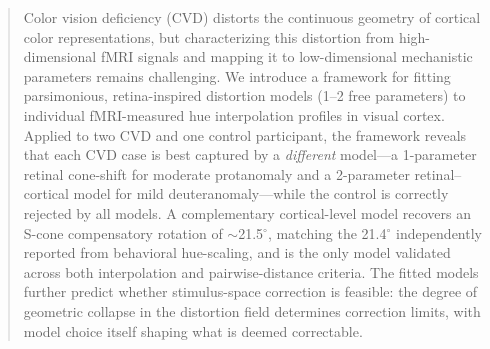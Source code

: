 \documentclass{article}
\begin{document}

\printAffiliationsAndNotice{}

\begin{abstract}
Color vision deficiency (CVD) distorts the continuous geometry of cortical color representations, but characterizing this distortion from high-dimensional fMRI signals and mapping it to low-dimensional mechanistic parameters remains challenging.
We introduce a framework for fitting parsimonious, retina-inspired distortion models (1--2 free parameters) to individual fMRI-measured hue interpolation profiles in visual cortex.
Applied to two CVD and one control participant, the framework reveals that each CVD case is best captured by a \emph{different} model---a 1-parameter retinal cone-shift for moderate protanomaly and a 2-parameter retinal--cortical model for mild deuteranomaly---while the control is correctly rejected by all models.
A complementary cortical-level model recovers an S-cone compensatory rotation of $\sim$21.5$^\circ$, matching the 21.4$^\circ$ independently reported from behavioral hue-scaling, and is the only model validated across both interpolation and pairwise-distance criteria.
The fitted models further predict whether stimulus-space correction is feasible: the degree of geometric collapse in the distortion field determines correction limits, with model choice itself shaping what is deemed correctable.
\end{abstract}

\end{document}
